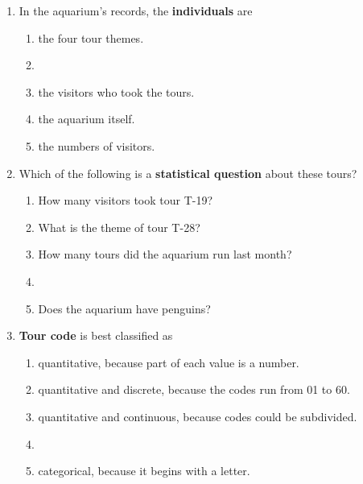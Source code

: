 \documentclass[12pt]{article}
\newcommand{\letterroom}{\rule[-15pt]{0pt}{36pt}}
\begin{document}
\begin{enumerate}[leftmargin=1.9em, itemsep=0.13in]

  \boxguard[9]
  \item In the aquarium's records, the \textbf{individuals} are
        \begin{enumerate}[label=\textbf{(\Alph*)}, leftmargin=2.2em, itemsep=2pt]
          \item the four tour themes.
          \item {}
          \item the visitors who took the tours.
          \item the aquarium itself.
          \item the numbers of visitors.
                \hfill{}\letterroom
        \end{enumerate}

  \boxguard[9]
  \item Which of the following is a \textbf{statistical question} about these tours?
        \begin{enumerate}[label=\textbf{(\Alph*)}, leftmargin=2.2em, itemsep=2pt]
          \item How many visitors took tour T-19?
          \item What is the theme of tour T-28?
          \item How many tours did the aquarium run last month?
          \item {}
          \item Does the aquarium have penguins?
                \hfill{}\letterroom
        \end{enumerate}

  \boxguard[9]
  \item \textbf{Tour code} is best classified as
        \begin{enumerate}[label=\textbf{(\Alph*)}, leftmargin=2.2em, itemsep=2pt]
          \item quantitative, because part of each value is a number.
          \item quantitative and discrete, because the codes run from 01 to 60.
          \item quantitative and continuous, because codes could be subdivided.
          \item {}
          \item categorical, because it begins with a letter.
                \hfill{}\letterroom
        \end{enumerate}


\end{enumerate}
\end{document}

